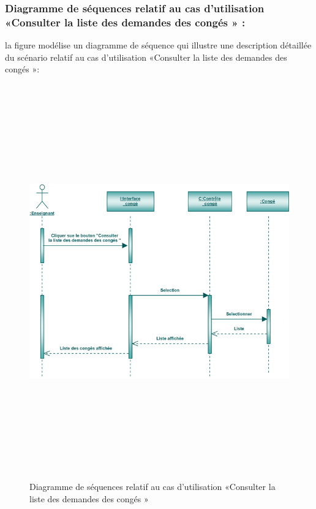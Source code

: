 \documentclass[12 pt ]{report}
\begin{document}
\subsubsection{Diagramme de séquences relatif au cas d’utilisation «Consulter la liste des demandes des congés » :}
la figure   modélise un diagramme de séquence qui illustre une description détaillée du scénario relatif au cas d’utilisation «Consulter la liste des demandes des congés »: 
\begin{figure}[h]
 \begin{center}
\includegraphics[width= 18 cm ,height=  17cm]{scc.PNG}
\caption{Diagramme de séquences relatif au cas d’utilisation «Consulter la liste des demandes des congés »}

\end{center}
\end{figure}
\end{document}
